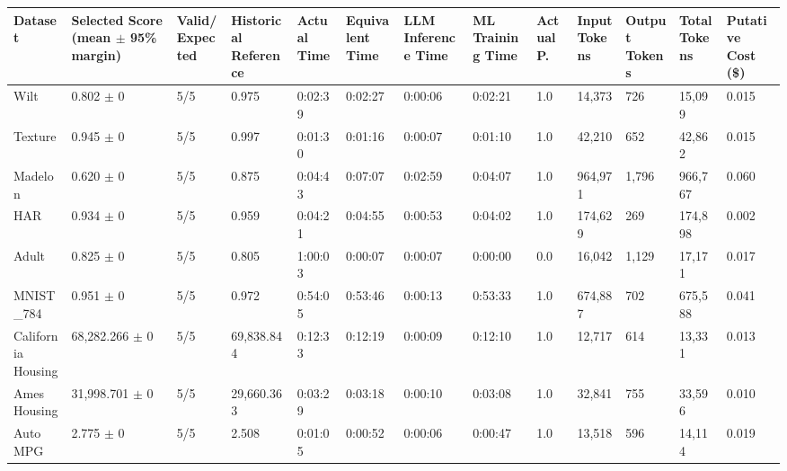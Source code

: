 \begin{tabular}{lllllllllllll}
\hline
Dataset & Selected Score (mean \ensuremath{\pm} 95\% margin) & Valid/Expected & Historical Reference & Actual Time & Equivalent Time & LLM Inference Time & ML Training Time & Actual P. & Input Tokens & Output Tokens & Total Tokens & Putative Cost (\$) \\
\hline
Wilt & 0.802 \ensuremath{\pm} 0 & 5/5 & 0.975 & 0:02:39 & 0:02:27 & 0:00:06 & 0:02:21 & 1.0 & 14,373 & 726 & 15,099 & 0.015 \\
Texture & 0.945 \ensuremath{\pm} 0 & 5/5 & 0.997 & 0:01:30 & 0:01:16 & 0:00:07 & 0:01:10 & 1.0 & 42,210 & 652 & 42,862 & 0.015 \\
Madelon & 0.620 \ensuremath{\pm} 0 & 5/5 & 0.875 & 0:04:43 & 0:07:07 & 0:02:59 & 0:04:07 & 1.0 & 964,971 & 1,796 & 966,767 & 0.060 \\
HAR & 0.934 \ensuremath{\pm} 0 & 5/5 & 0.959 & 0:04:21 & 0:04:55 & 0:00:53 & 0:04:02 & 1.0 & 174,629 & 269 & 174,898 & 0.002 \\
Adult & 0.825 \ensuremath{\pm} 0 & 5/5 & 0.805 & 1:00:03 & 0:00:07 & 0:00:07 & 0:00:00 & 0.0 & 16,042 & 1,129 & 17,171 & 0.017 \\
MNIST\_784 & 0.951 \ensuremath{\pm} 0 & 5/5 & 0.972 & 0:54:05 & 0:53:46 & 0:00:13 & 0:53:33 & 1.0 & 674,887 & 702 & 675,588 & 0.041 \\
California Housing & 68,282.266 \ensuremath{\pm} 0 & 5/5 & 69,838.844 & 0:12:33 & 0:12:19 & 0:00:09 & 0:12:10 & 1.0 & 12,717 & 614 & 13,331 & 0.013 \\
Ames Housing & 31,998.701 \ensuremath{\pm} 0 & 5/5 & 29,660.363 & 0:03:29 & 0:03:18 & 0:00:10 & 0:03:08 & 1.0 & 32,841 & 755 & 33,596 & 0.010 \\
Auto MPG & 2.775 \ensuremath{\pm} 0 & 5/5 & 2.508 & 0:01:05 & 0:00:52 & 0:00:06 & 0:00:47 & 1.0 & 13,518 & 596 & 14,114 & 0.019 \\
\hline
\end{tabular}
